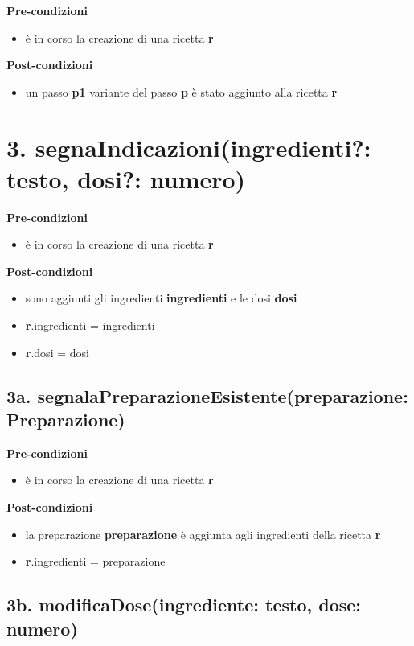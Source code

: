 \documentclass[12pt]{extarticle}
\begin{document}
\textbf{Pre-condizioni}
\begin{itemize}
  \item è in corso la creazione di una ricetta  \textbf{r}
\end{itemize}
\textbf{Post-condizioni}
\begin{itemize}
  \item un passo  \textbf{p1} variante del passo  \textbf{p} è stato aggiunto alla ricetta  \textbf{r}
\end{itemize}

\section*{3. segnaIndicazioni(ingredienti?: testo, dosi?: numero)}

\textbf{Pre-condizioni}
\begin{itemize}
  \item è in corso la creazione di una ricetta  \textbf{r}
\end{itemize}
\textbf{Post-condizioni}
\begin{itemize}
  \item sono aggiunti gli ingredienti  \textbf{ingredienti} e le dosi  \textbf{dosi}
  \item \textbf{r}.ingredienti = ingredienti
  \item \textbf{r}.dosi = dosi
\end{itemize}

\subsection*{3a. segnalaPreparazioneEsistente(preparazione: Preparazione)}

\textbf{Pre-condizioni}
\begin{itemize}
  \item è in corso la creazione di una ricetta  \textbf{r}
\end{itemize}
\textbf{Post-condizioni}
\begin{itemize}
  \item la preparazione  \textbf{preparazione} è aggiunta agli ingredienti della ricetta  \textbf{r}
  \item \textbf{r}.ingredienti = preparazione
\end{itemize}

\subsection*{3b. modificaDose(ingrediente: testo, dose: numero)}
\end{document}
